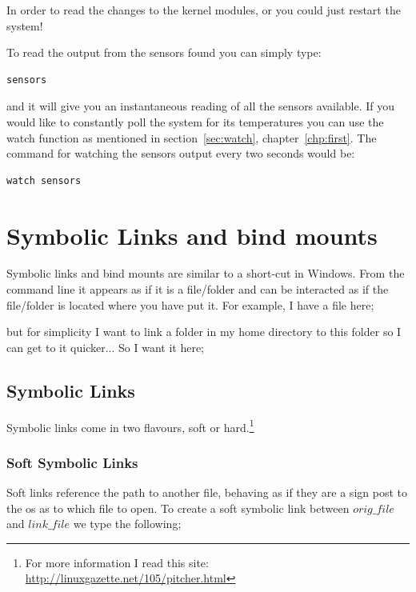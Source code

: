 In order to read the changes to the kernel modules, or you could just restart the system!

To read the output from the sensors found you can simply type:

\begin{lstlisting}
sensors
\end{lstlisting}

and it will give you an instantaneous reading of all the sensors available.  If you would like to constantly poll the system for its temperatures you can use the watch function as mentioned in section~\ref{sec:watch}, chapter~\ref{chp:first}.  The command for watching the sensors output every two seconds would be:

\begin{lstlisting}
watch sensors
\end{lstlisting}


\section{Symbolic Links and bind mounts}
\label{sec:symlink}

Symbolic links and bind mounts are similar to a short-cut in Windows.  From the command line it appears as if it is a file/folder and can be interacted as if the file/folder is located where you have put it.  For example, I have a file here;


but for simplicity I want to link a folder in my home directory to this folder so I can get to it quicker... So I want it here;


\subsection{Symbolic Links}

Symbolic links come in two flavours, soft or hard.\footnote{For more information I read this site: \url{http://linuxgazette.net/105/pitcher.html}}

\subsubsection{Soft Symbolic Links}

Soft links reference the path to another file, behaving as if they are a sign post to the os as to which file to open.  To create a soft symbolic link between $orig\_file$ and $link\_file$ we type the following;

